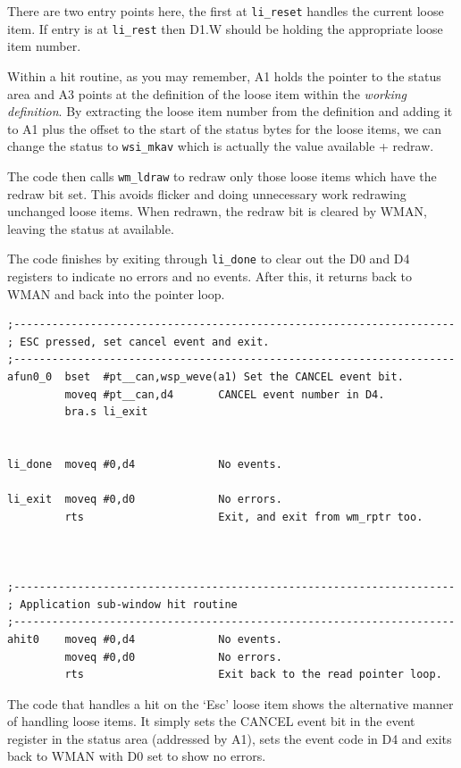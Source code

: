 There are two entry points here, the first at
 \texttt{li\_reset} handles the current loose item. If entry is
    at \texttt{li\_rest} then D1.W should be holding the
    appropriate loose item number.

Within a hit routine, as you may remember, A1 holds the pointer to
    the status area and A3 points at the definition of the loose item within
    the \emph{working definition}. By extracting the loose item
    number from the definition and adding it to A1 plus the offset to the
    start of the status bytes for the loose items, we can change the status to
 \texttt{wsi\_mkav} which is actually the value available +
    redraw.

The code then calls \texttt{wm\_ldraw} to redraw only
    those loose items which have the redraw bit set. This avoids flicker and
    doing unnecessary work redrawing unchanged loose items. When redrawn, the
    redraw bit is cleared by WMAN, leaving the
    status at available.

The code finishes by exiting through \texttt{li\_done} to
    clear out the D0 and D4 registers to indicate no errors and no events.
    After this, it returns back to WMAN and back
    into the pointer loop.

\begin{lstlisting}[firstnumber=1,]
;---------------------------------------------------------------------
; ESC pressed, set cancel event and exit.
;---------------------------------------------------------------------
afun0_0  bset  #pt__can,wsp_weve(a1) Set the CANCEL event bit.
         moveq #pt__can,d4       CANCEL event number in D4.
         bra.s li_exit


li_done  moveq #0,d4             No events.

li_exit  moveq #0,d0             No errors.
         rts                     Exit, and exit from wm_rptr too.



;---------------------------------------------------------------------
; Application sub-window hit routine
;---------------------------------------------------------------------
ahit0    moveq #0,d4             No events.
         moveq #0,d0             No errors.
         rts                     Exit back to the read pointer loop.
\end{lstlisting}

The code that handles a hit on the `Esc' loose item shows the
    alternative manner of handling loose items. It simply sets the CANCEL
    event bit in the event register in the status area (addressed by A1), sets
    the event code in D4 and exits back to WMAN     with D0 set to show no errors.

